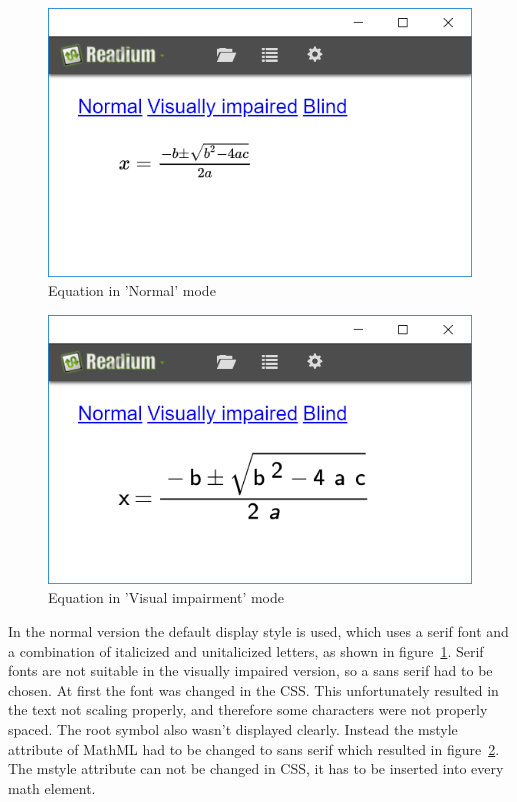 \begin{figure}[H]
	\centering
	\includegraphics[width=\linewidth*2/3]{figures/EquationNo.PNG}
	\caption{Equation in 'Normal' mode}
	\label{fig:equation_normal}
\end{figure}

\begin{figure}[H]
	\centering
	\includegraphics[width=\linewidth*2/3]{figures/EquationVi.PNG}
	\caption{Equation in 'Visual impairment' mode}
	\label{fig:equation_viimp}
\end{figure}



In the normal version the default display style is used, which uses a serif font and a combination of italicized and unitalicized letters, as shown in figure~\ref{fig:equation_normal}. Serif fonts are not suitable in the visually impaired version, so a sans serif had to be chosen. At first the font was changed in the CSS. This unfortunately resulted in the text not scaling properly, and therefore some characters were not properly spaced. The root symbol also wasn't displayed clearly. Instead the mstyle attribute of MathML had to be changed to sans serif which resulted in figure~\ref{fig:equation_viimp}. The mstyle attribute can not be changed in CSS, it has to be inserted into every math element.

